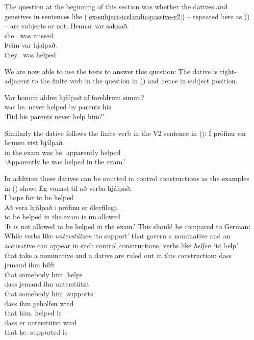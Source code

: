 The question at the beginning of this section was whether the datives and genetives in sentences
like (\ref{ex-subject-icelandic-passive-v2}) -- repeated here as () -- are subjects or not.
\eal
\ex 
\gll Hennar var saknað.\\
     she.\SG.\GEN{} was missed\\
\ex 
\gll Þeim       var hjalpað.\\
     they.\PL.\DAT{} was helped\\
\zl

We are now able to use the tests to answer this question: The dative is right-adjacent to the finite
verb in the question in () and hence in subject position.

\ea
\gll Var honum     aldrei hjfilpað af foreldrum sinum?\\
     was he.\DAT{} never  helped   by parents   his\\
\glt `Did his parents never help him?'
\z

Similarly the dative follows the finite verb in the V2 sentence in ():
\ea
\gll Í prófinu  var honum vist hjálpað.\\
     in the.exam was he.\DAT{} apparently helped\\
\glt `Apparently he was helped in the exam.'
\z

In addition these datives can be omitted in control constructions as the examples in () show:
\eal
\ex
\gll Ég vonast til að verba hjálpað.\\
     I  hope   for to be helped\\
\ex
\gll Að vera hjálpað i prófinu er óleyfilegt.\\
     to be helped in the.exam is un.allowed\\
\glt `It is not allowed to be helped in the exam.'
\zl
This should be compared to German: While verbs like \emph{unterstützen} `to support' that govern a
nominative and an accusative can appear in such control constructions, verbs like \emph{helfen} `to
help' that take a nominative and a dative are ruled out in this construction:
\eal
\ex 
\gll dass jemand ihm hilft\\
     that somebody him.\DAT{} helps\\
\ex
\gll dass jemand ihn unterstützt\\
     that somebody him.\ACC{} supports\\
\ex
\gll  dass ihm geholfen wird\\
      that him.\DAT{} helped is\\
\ex
\gll  dass er unterstützt wird\\
      that he.\NOM{} supported is\\
\zl

